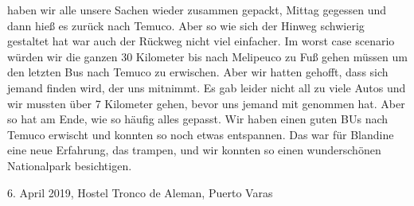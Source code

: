 \documentclass[11pt]{book}
\begin{document}
haben wir alle unsere Sachen wieder zusammen gepackt, Mittag gegessen und dann hieß es zurück nach Temuco. Aber so wie sich der 
Hinweg schwierig gestaltet hat war auch der Rückweg nicht viel einfacher. Im worst case scenario würden wir die ganzen 30 Kilometer 
bis nach Melipeuco zu Fuß gehen müssen um den letzten Bus nach Temuco zu erwischen. Aber wir hatten gehofft, dass sich jemand finden 
wird, der uns mitnimmt. Es gab leider nicht all zu viele Autos und wir mussten über 7 Kilometer gehen, bevor uns jemand mit genommen hat. 
Aber so hat am Ende, wie so häufig alles gepasst. Wir haben einen guten BUs nach Temuco erwischt und konnten so noch etwas entspannen. 
Das war für Blandine eine neue Erfahrung, das trampen, und wir konnten so einen wunderschönen Nationalpark besichtigen.


6. April 2019, Hostel Tronco de Aleman, Puerto Varas
\end{document}
